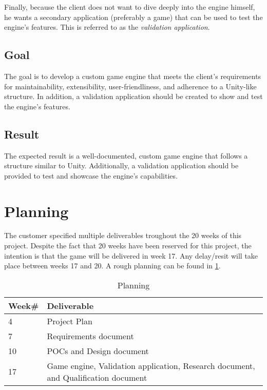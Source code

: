 \documentclass{projdoc}
\begin{document}
Finally, because the client does not want to dive deeply into the engine himself, he
wants a secondary application (preferably a game) that can be used to test the
engine's features. This is referred to as the \emph{validation application}.

\subsection{Goal}

The goal is to develop a custom game engine that meets the client's requirements for
maintainability, extensibility, user-friendliness, and adherence to a Unity-like
structure. In addition, a validation application should be created to show and test
the engine's features.

\subsection{Result}

The expected result is a well-documented, custom game engine that follows a structure
similar to Unity. Additionally, a validation application should be provided to test
and showcase the engine's capabilities.

\section{Planning}

The customer specified multiple deliverables troughout the 20 weeks of this project.
Despite the fact that 20 weeks have been reserved for this project, the intention is
that the game will be delivered in week 17. Any delay/resit will take place between
weeks 17 and 20. A rough planning can be found in \cref{tab:planning}.

\begin{table}
	\begin{tabularx}{\linewidth}{lX}
		\toprule
		\textbf{Week\#} & \textbf{Deliverable}\\
		\midrule
		4 & Project Plan\\
		7 & Requirements document\\
		10 & POCs and Design document\\
		17 & Game engine, Validation application, Research document, and Qualification
		document\\
		\bottomrule
	\end{tabularx}
	\caption{Planning}
	\label{tab:planning}
\end{table}
\end{document}
